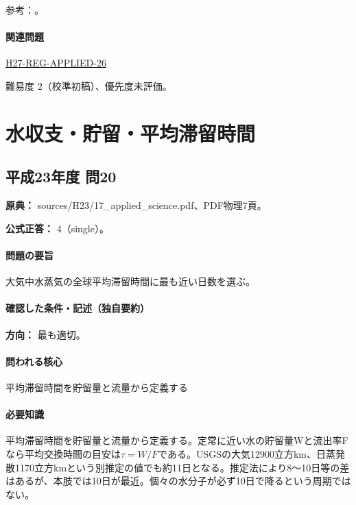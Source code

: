 \par 参考：\cite{atm_jma_acid,atm_jma_acid2014}。

\paragraph{関連問題} \hyperref[q:h27-reg-applied-26]{H27-REG-APPLIED-26}

\par 難易度 2（校準初稿）、優先度未評価。

\section{水収支・貯留・平均滞留時間}

\subsection{平成23年度 問20}
\label{q:h23-reg-applied-20}

\noindent\textbf{原典：} sources/H23/17\_applied\_science.pdf、PDF物理7頁。

\textbf{公式正答：} 4（single）。

\paragraph{問題の要旨} 大気中水蒸気の全球平均滞留時間に最も近い日数を選ぶ。

\paragraph{確認した条件・記述（独自要約）}\mbox{}\par

\noindent\textbf{方向：} 最も適切。\par

\paragraph{問われる核心} 平均滞留時間を貯留量と流量から定義する

\paragraph{必要知識} 平均滞留時間を貯留量と流量から定義する。定常に近い水の貯留量Wと流出率Fなら平均交換時間の目安は\(\tau=W/F\)である。USGSの大気12900立方km、日蒸発散1170立方kmという別推定の値でも約11日となる。推定法により8〜10日等の差はあるが、本肢では10日が最近。個々の水分子が必ず10日で降るという周期ではない。

